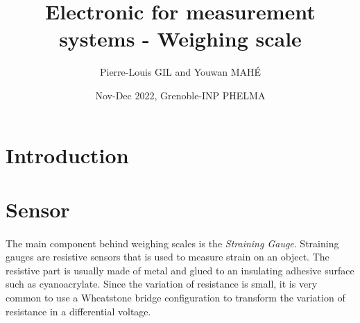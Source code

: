 \documentclass{article}[12pt]
\title{Electronic for measurement systems - Weighing scale}
\author{Pierre-Louis GIL and Youwan MAHÉ}
\date{Nov-Dec 2022, Grenoble-INP PHELMA}
\begin{document}
\maketitle
\tableofcontents
\newpage

\section{Introduction}
\paragraph{}
\section{Sensor}
\paragraph{}
The main component behind weighing scales is the \emph{Straining Gauge}. Straining gauges are resistive sensors that is used to measure strain on an object. The resistive part is usually made of metal and glued to an insulating adhesive surface such as cyanoacrylate. Since the variation of resistance is  small, it is very common to use a Wheatstone bridge configuration to transform the variation of resistance in a differential voltage.
\end{document}
